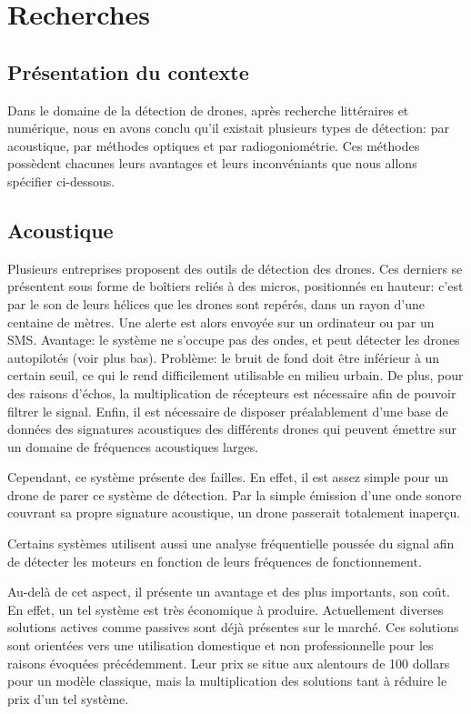 
\chapter{Recherches}

\section{Présentation du contexte}

Dans le domaine de la détection de drones, après recherche littéraires et numérique, nous en avons conclu qu'il existait plusieurs types de détection: par acoustique, par méthodes optiques et par radiogoniométrie.
Ces méthodes possèdent chacunes leurs avantages et leurs inconvéniants que nous allons spécifier ci-dessous.


\section{Acoustique}

Plusieurs entreprises proposent des outils de détection des drones. Ces derniers se présentent sous forme de boîtiers reliés à des micros, positionnés en hauteur: c'est par le son de leurs hélices que les drones sont repérés, dans un rayon d'une centaine de mètres. Une alerte est alors envoyée sur un ordinateur ou par un SMS. Avantage: le système ne s'occupe pas des ondes, et peut détecter les drones autopilotés (voir plus bas). Problème: le bruit de fond doit être inférieur à un certain seuil, ce qui le rend difficilement utilisable en milieu urbain. De plus, pour des raisons d'échos, la multiplication de récepteurs est nécessaire afin de pouvoir filtrer le signal. Enfin, il est nécessaire de disposer préalablement d'une base de données des signatures acoustiques des différents drones qui peuvent émettre sur un domaine de fréquences acoustiques larges.

Cependant, ce système présente des failles. En effet, il est assez simple pour un drone de parer ce système de détection. Par la simple émission d'une onde sonore couvrant sa propre signature acoustique, un drone passerait totalement inaperçu.

Certains systèmes utilisent aussi une analyse fréquentielle poussée du signal afin de détecter les moteurs en fonction de leurs fréquences de fonctionnement.

Au-delà de cet aspect, il présente un avantage et des plus importants, son coût. En effet, un tel système est très économique à produire. Actuellement diverses solutions actives comme passives sont déjà présentes sur le marché. Ces solutions sont orientées vers une utilisation domestique et non professionnelle pour les raisons évoquées précédemment. Leur prix se situe aux alentours de 100 dollars pour un modèle classique, mais la multiplication des solutions tant à réduire le prix d'un tel système. 

